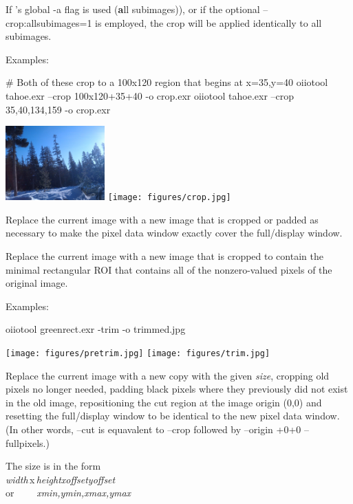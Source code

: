 If \oiiotool's global {\cf -a} flag is used ({\bf a}ll subimages)), or if the
optional {\cf --crop:allsubimages=1} is employed, the crop will be applied
identically to all subimages.

\noindent Examples:

\begin{code}
    # Both of these crop to a 100x120 region that begins at x=35,y=40
    oiiotool tahoe.exr --crop 100x120+35+40 -o crop.exr
    oiiotool tahoe.exr --crop 35,40,134,159 -o crop.exr
\end{code}

\hspace{0.4in} \includegraphics[width=1.5in]{figures/tahoe-small.jpg}
\raisebox{40pt}{\large $\rightarrow$}
 \texttt{[image: figures/crop.jpg]}
\apiend

Replace the current image with a new image that is cropped or padded
as necessary to make the pixel data window exactly cover
the full/display window.
\apiend

Replace the current image with a new image that is cropped to contain the
minimal rectangular ROI that contains all of the nonzero-valued pixels of
the original image.

\noindent Examples:

\begin{code}
    oiiotool greenrect.exr -trim -o trimmed.jpg
\end{code}
\hspace{0.4in} \texttt{[image: figures/pretrim.jpg]}
\raisebox{40pt}{\large $\rightarrow$}
 \texttt{[image: figures/trim.jpg]}
\apiend

Replace the current image with a new copy with the given \emph{size},
cropping old pixels no longer needed, padding black pixels where they
previously did not exist in the old image, repositioning the cut region
at the image origin (0,0) and resetting the full/display window to be
identical to the new pixel data window.  (In other words, {\cf --cut}
is equavalent to {\cf --crop} followed by {\cf --origin +0+0 --fullpixels}.)

The size is in the form 
\\ \spc\spc \emph{width}\,{\cf x}\,\emph{height}{\cf [+-]}\emph{xoffset}{\cf
  [+-]}\emph{yoffset}
\\ or~~~~ \spc \emph{xmin,ymin,xmax,ymax} \\

